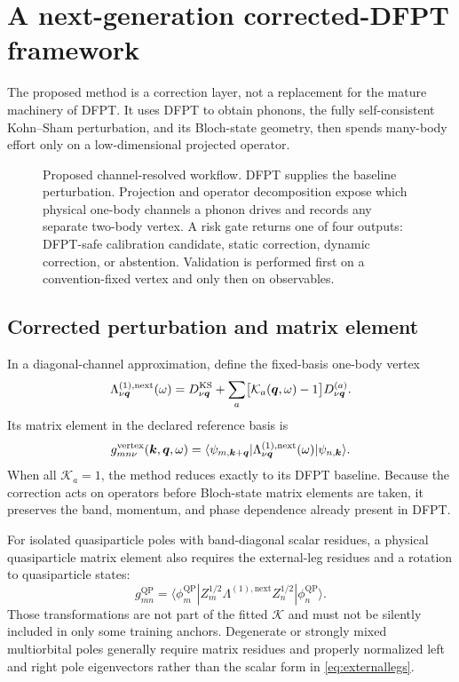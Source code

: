 \section{A next-generation corrected-DFPT framework}
\label{sec:nextdfpt}

The proposed method is a correction layer, not a replacement for the mature
machinery of DFPT.  It uses DFPT to obtain phonons, the fully self-consistent
Kohn--Sham perturbation, and its Bloch-state geometry, then spends many-body effort
only on a low-dimensional projected operator.

\begin{figure}[t]
  \centering
  \resizebox{\linewidth}{!}{}
  \caption{Proposed channel-resolved workflow.  DFPT supplies the baseline
  perturbation.  Projection and operator decomposition expose which physical
  one-body channels a phonon drives and records any separate two-body vertex.  A
  risk gate returns one of four outputs: DFPT-safe calibration candidate, static
  correction, dynamic correction, or abstention.  Validation is performed first
  on a convention-fixed vertex and only then on observables.}
  \label{fig:framework}
\end{figure}

\subsection{Corrected perturbation and matrix element}

In a diagonal-channel approximation, define the fixed-basis one-body vertex
\begin{equation}
  \Lambda^{(1),\mathrm{next}}_{\nu\bm{q}}(\omega)
  =D^{\mathrm{KS}}_{\nu\bm{q}}
  +\sum_a\bigl[\mathcal K_a(\bm{q},\omega)-1\bigr]
   D^{(a)}_{\nu\bm{q}}.
  \label{eq:dnext}
\end{equation}
Its matrix element in the declared reference basis is
\begin{equation}
  g^{\mathrm{vertex}}_{mn\nu}(\bm{k},\bm{q},\omega)
  =\langle\psi_{m,\bm{k}+\bm{q}}|
    \Lambda^{(1),\mathrm{next}}_{\nu\bm{q}}(\omega)
    |\psi_{n,\bm{k}}\rangle.
  \label{eq:gnext}
\end{equation}
When all $\mathcal K_a=1$, the method reduces exactly to its DFPT baseline.
Because the correction acts on operators before Bloch-state matrix elements are
taken, it preserves the band, momentum, and phase dependence already present in
DFPT.

For isolated quasiparticle poles with band-diagonal scalar residues, a physical
quasiparticle matrix element also requires the external-leg residues and a
rotation to quasiparticle states:
\begin{equation}
  g^{\mathrm{QP}}_{mn}
  =\langle\phi^{\mathrm{QP}}_m|
    Z_m^{1/2}\Lambda^{(1),\mathrm{next}}Z_n^{1/2}
    |\phi^{\mathrm{QP}}_n\rangle .
  \label{eq:externallegs}
\end{equation}
Those transformations are not part of the fitted $\mathcal K$ and must not be
silently included in only some training anchors.  Degenerate or strongly mixed
multiorbital poles generally require matrix residues and properly normalized left
and right pole eigenvectors rather than the scalar form in
\cref{eq:externallegs}.

